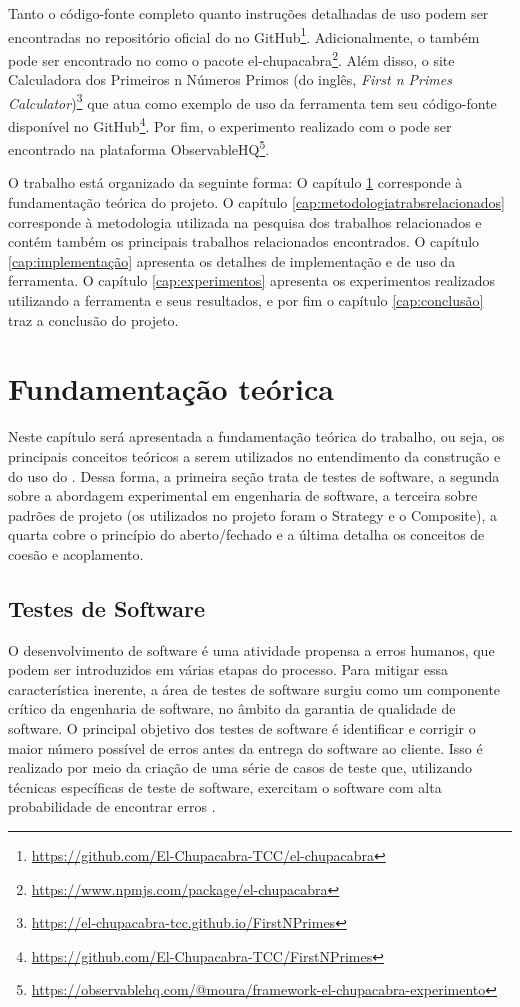 \documentclass[12pt]{tcc}
\begin{document}
	Tanto o código-fonte completo quanto instruções detalhadas de uso podem ser encontradas no repositório oficial do  no GitHub\footnote{\url{https://github.com/El-Chupacabra-TCC/el-chupacabra}}.
	Adicionalmente, o  também pode ser encontrado no  como o pacote el-chupacabra\footnote{\url{https://www.npmjs.com/package/el-chupacabra}}.
	Além disso, o site Calculadora dos Primeiros n Números Primos (do inglês, \emph{First n Primes Calculator})\footnote{\url{https://el-chupacabra-tcc.github.io/FirstNPrimes}} que atua como exemplo de uso da ferramenta tem seu código-fonte disponível no GitHub\footnote{\url{https://github.com/El-Chupacabra-TCC/FirstNPrimes}}.
	Por fim, o experimento realizado com o  pode ser encontrado na plataforma ObservableHQ\footnote{\url{https://observablehq.com/@moura/framework-el-chupacabra-experimento}}.

	O trabalho está organizado da seguinte forma: O capítulo \ref{cap:fundamentacao_teorica} corresponde à fundamentação teórica do projeto. O capítulo \ref{cap:metodologiatrabsrelacionados} corresponde à metodologia utilizada na pesquisa dos trabalhos relacionados e contém também os principais trabalhos relacionados encontrados. O capítulo \ref{cap:implementação} apresenta os detalhes de implementação e de uso da ferramenta. O capítulo \ref{cap:experimentos} apresenta os experimentos realizados utilizando a ferramenta e seus resultados, e por fim o capítulo \ref{cap:conclusão} traz a conclusão do projeto.


\chapter{Fundamentação teórica}
	\label{cap:fundamentacao_teorica}

		Neste capítulo será apresentada a fundamentação teórica do trabalho, ou seja, os principais conceitos teóricos a serem utilizados no entendimento da construção e do uso do .
		Dessa forma, a primeira seção trata de testes de software, a segunda sobre a abordagem experimental em engenharia de software, a terceira sobre padrões de projeto (os utilizados no projeto foram o Strategy e o Composite), a quarta cobre o princípio do aberto/fechado e a última detalha os conceitos de coesão e acoplamento.

		\section{Testes de Software}
		\label{cap:software-testing}
		O desenvolvimento de software é uma atividade propensa a erros humanos, que podem ser introduzidos em várias etapas do processo.
		Para mitigar essa característica inerente, a área de testes de software surgiu como um componente crítico da engenharia de software, no âmbito da garantia de qualidade de software.
		O principal objetivo dos testes de software é identificar e corrigir o maior número possível de erros antes da entrega do software ao cliente.
		Isso é realizado por meio da criação de uma série de casos de teste que, utilizando técnicas específicas de teste de software, exercitam o software com alta probabilidade de encontrar erros \citep{pressman2009software}.
\end{document}
